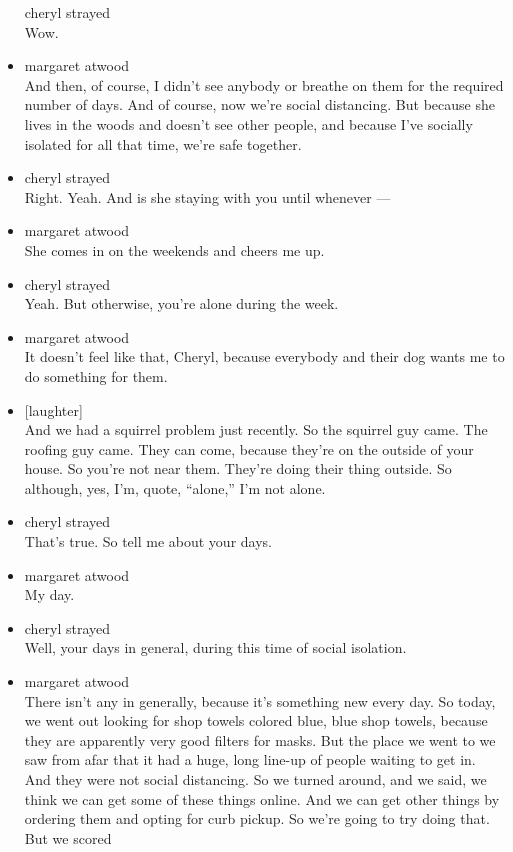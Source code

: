 \begin{itemize}
  cheryl strayed\\
  Wow.
\item
  margaret atwood\\
  And then, of course, I didn't see anybody or breathe on them for the
  required number of days. And of course, now we're social distancing.
  But because she lives in the woods and doesn't see other people, and
  because I've socially isolated for all that time, we're safe together.
\item
  cheryl strayed\\
  Right. Yeah. And is she staying with you until whenever ---
\item
  margaret atwood\\
  She comes in on the weekends and cheers me up.
\item
  cheryl strayed\\
  Yeah. But otherwise, you're alone during the week.
\item
  margaret atwood\\
  It doesn't feel like that, Cheryl, because everybody and their dog
  wants me to do something for them.
\item
  {[}laughter{]}\\
  And we had a squirrel problem just recently. So the squirrel guy came.
  The roofing guy came. They can come, because they're on the outside of
  your house. So you're not near them. They're doing their thing
  outside. So although, yes, I'm, quote, ``alone,'' I'm not alone.
\item
  cheryl strayed\\
  That's true. So tell me about your days.
\item
  margaret atwood\\
  My day.
\item
  cheryl strayed\\
  Well, your days in general, during this time of social isolation.
\item
  margaret atwood\\
  There isn't any in generally, because it's something new every day. So
  today, we went out looking for shop towels colored blue, blue shop
  towels, because they are apparently very good filters for masks. But
  the place we went to we saw from afar that it had a huge, long line-up
  of people waiting to get in. And they were not social distancing. So
  we turned around, and we said, we think we can get some of these
  things online. And we can get other things by ordering them and opting
  for curb pickup. So we're going to try doing that. But we scored

\end{itemize}
